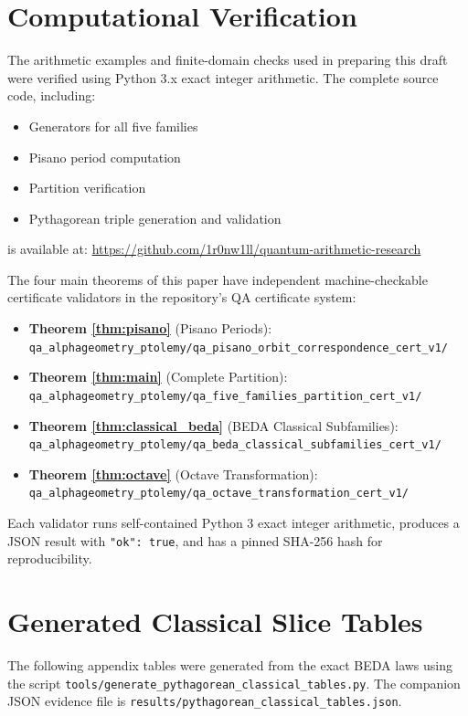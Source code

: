 \documentclass[12pt]{article}
\begin{document}
\appendix

\section{Computational Verification}

The arithmetic examples and finite-domain checks used in preparing this draft were verified using Python 3.x exact integer arithmetic. The complete source code, including:
\begin{itemize}
\item Generators for all five families
\item Pisano period computation
\item Partition verification
\item Pythagorean triple generation and validation
\end{itemize}

is available at: \url{https://github.com/1r0nw1ll/quantum-arithmetic-research}

\noindent The four main theorems of this paper have independent machine-checkable certificate validators in the repository's QA certificate system:
\begin{itemize}
\item \textbf{Theorem \ref{thm:pisano}} (Pisano Periods): \texttt{qa\_alphageometry\_ptolemy/qa\_pisano\_orbit\_correspondence\_cert\_v1/}
\item \textbf{Theorem \ref{thm:main}} (Complete Partition): \texttt{qa\_alphageometry\_ptolemy/qa\_five\_families\_partition\_cert\_v1/}
\item \textbf{Theorem \ref{thm:classical_beda}} (BEDA Classical Subfamilies): \texttt{qa\_alphageometry\_ptolemy/qa\_beda\_classical\_subfamilies\_cert\_v1/}
\item \textbf{Theorem \ref{thm:octave}} (Octave Transformation): \texttt{qa\_alphageometry\_ptolemy/qa\_octave\_transformation\_cert\_v1/}
\end{itemize}

Each validator runs self-contained Python 3 exact integer arithmetic, produces a JSON result with \texttt{"ok": true}, and has a pinned SHA-256 hash for reproducibility.

\section{Generated Classical Slice Tables}

The following appendix tables were generated from the exact BEDA laws using the script \texttt{tools/generate\_pythagorean\_classical\_tables.py}. The companion JSON evidence file is \texttt{results/pythagorean\_classical\_tables.json}.
\end{document}
